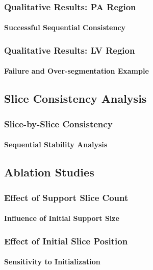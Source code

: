 \documentclass[nometaot,lecture,amberg,autotoc,toc=twocolumn,indicatelastpageofframe,footlinebox]{OTHAWbeamer}
\begin{document}
\begin{frame}
    \frametitle{Qualitative Results: PA Region}
    \framesubtitle{Successful Sequential Consistency}

    \centering


\end{frame}

\begin{frame}
    \frametitle{Qualitative Results: LV Region}
    \framesubtitle{Failure and Over-segmentation Example}

    \centering


\end{frame}

\subsection{Slice Consistency Analysis}

\begin{frame}
    \frametitle{Slice-by-Slice Consistency}
    \framesubtitle{Sequential Stability Analysis}

    \centering


\end{frame}

\subsection{Ablation Studies}

\begin{frame}
    \frametitle{Effect of Support Slice Count}
    \framesubtitle{Influence of Initial Support Size}

    \centering


\end{frame}

\begin{frame}
    \frametitle{Effect of Initial Slice Position}
    \framesubtitle{Sensitivity to Initialization}

    \centering


\end{frame}

\end{document}
